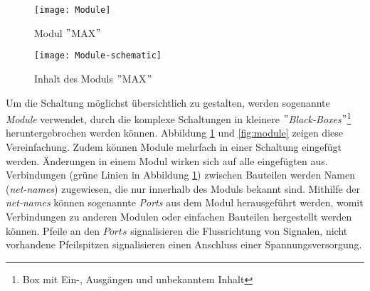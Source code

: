 \begin{figure}[h]
	\centering	\begin{minipage}{.35\linewidth}
		\centering
		\texttt{[image: Module]}
		\caption{Modul $"$MAX$"$}
		\label{fig:module}
	\end{minipage}
	\hfill
	\begin{minipage}{.6\linewidth}
		\centering
		\texttt{[image: Module-schematic]}
		\caption{Inhalt des Moduls $"$MAX$"$}
		\label{fig:module-schematic}
	\end{minipage}
\end{figure}
Um die Schaltung möglichst übersichtlich zu gestalten, werden sogenannte \textit{Module} verwendet, durch die komplexe Schaltungen in kleinere \textit{$"$Black-Boxes$"$}\footnote{Box mit Ein-, Ausgängen und unbekanntem Inhalt} heruntergebrochen werden können. Abbildung \ref{fig:module-schematic} und \ref{fig:module} zeigen diese Vereinfachung. Zudem können Module mehrfach in einer Schaltung eingefügt werden. Änderungen in einem Modul wirken sich auf alle eingefügten aus. Verbindungen (grüne Linien in Abbildung \ref{fig:module-schematic}) zwischen Bauteilen werden Namen (\textit{net-names}) zugewiesen, die nur innerhalb des Moduls bekannt sind. Mithilfe der \textit{net-names} können sogenannte \textit{Ports} aus dem Modul herausgeführt werden, womit Verbindungen zu anderen Modulen oder einfachen Bauteilen hergestellt werden können. Pfeile an den $Ports$ signalisieren die Flussrichtung von Signalen, nicht vorhandene Pfeilspitzen signalisieren einen Anschluss einer Spannungsversorgung.\\